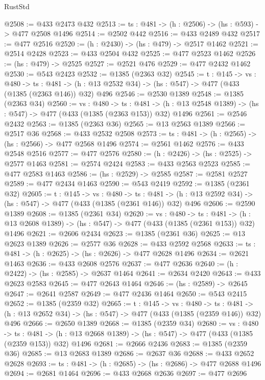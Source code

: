 \begin{lexlean}{RustStd}
\begin{coremodule}
@2508 := @433 @2473 @432
@2513 := {ts : @481} -> (h : @2506) -> (hs : @593) -> @477 @2508 @1496
@2514 := @2502 @442
@2516 := @433 @2489 @432
@2517 := @477 @2516
@2520 := (h : @2430) -> (hs : @479) -> @2517 @1462
@2521 := @2514 @2428
@2523 := @433 @2504 @432
@2525 := @477 @2523 @1462
@2526 := (hs : @479) -> @2525
@2527 := @2521 @476
@2529 := @477 @2432 @1462
@2530 := @543 @2423
@2532 := @1385 (@2363 @32)
@2545 := {t : @145} ->
  {vs : @480} ->
  {ts : @481} -> (h : @13 @2532 @34) -> (hs : @547) -> @477 (@433 (@1385 (@2363 @146)) @32) @496
@2546 := @2530 @1389
@2548 := @1385 (@2363 @34)
@2560 := {vs : @480} ->
  {ts : @481} -> (h : @13 @2548 @1389) -> (hs : @547) -> @477 (@433 (@1385 (@2363 @153)) @32) @1496
@2561 := @2546 @2432
@2563 := @1385 (@2363 @36)
@2565 := @13 @2563 @1389
@2566 := @2517 @36
@2568 := @433 @2532 @2508
@2573 := {ts : @481} -> (h : @2565) -> (hs : @2566) -> @477 @2568 @1496
@2574 := @2561 @1462
@2576 := @433 @2548 @2516
@2577 := @477 @2576
@2580 := (h : @2426) -> (hs : @2525) -> @2577 @1463
@2581 := @2574 @2424
@2583 := @433 @2563 @2523
@2585 := @477 @2583 @1463
@2586 := (hs : @2529) -> @2585
@2587 := @2581 @2527
@2589 := @477 @2434 @1463
@2590 := @543 @2419
@2592 := @1385 (@2361 @32)
@2605 := {t : @145} ->
  {vs : @480} ->
  {ts : @481} -> (h : @13 @2592 @34) -> (hs : @547) -> @477 (@433 (@1385 (@2361 @146)) @32) @496
@2606 := @2590 @1389
@2608 := @1385 (@2361 @34)
@2620 := {vs : @480} ->
  {ts : @481} -> (h : @13 @2608 @1389) -> (hs : @547) -> @477 (@433 (@1385 (@2361 @153)) @32) @1496
@2621 := @2606 @2434
@2623 := @1385 (@2361 @36)
@2625 := @13 @2623 @1389
@2626 := @2577 @36
@2628 := @433 @2592 @2568
@2633 := {ts : @481} -> (h : @2625) -> (hs : @2626) -> @477 @2628 @1496
@2634 := @2621 @1463
@2636 := @433 @2608 @2576
@2637 := @477 @2636
@2640 := (h : @2422) -> (hs : @2585) -> @2637 @1464
@2641 := @2634 @2420
@2643 := @433 @2623 @2583
@2645 := @477 @2643 @1464
@2646 := (hs : @2589) -> @2645
@2647 := @2641 @2587
@2649 := @477 @2436 @1464
@2650 := @543 @2415
@2652 := @1385 (@2359 @32)
@2665 := {t : @145} ->
  {vs : @480} ->
  {ts : @481} -> (h : @13 @2652 @34) -> (hs : @547) -> @477 (@433 (@1385 (@2359 @146)) @32) @496
@2666 := @2650 @1389
@2668 := @1385 (@2359 @34)
@2680 := {vs : @480} ->
  {ts : @481} -> (h : @13 @2668 @1389) -> (hs : @547) -> @477 (@433 (@1385 (@2359 @153)) @32) @1496
@2681 := @2666 @2436
@2683 := @1385 (@2359 @36)
@2685 := @13 @2683 @1389
@2686 := @2637 @36
@2688 := @433 @2652 @2628
@2693 := {ts : @481} -> (h : @2685) -> (hs : @2686) -> @477 @2688 @1496
@2694 := @2681 @1464
@2696 := @433 @2668 @2636
@2697 := @477 @2696

\end{coremodule}
\end{lexlean}
